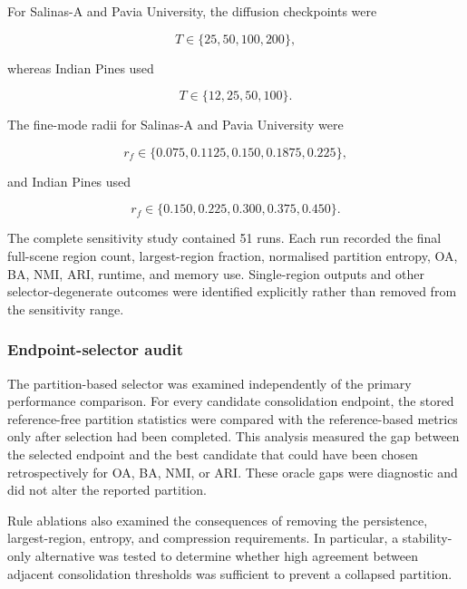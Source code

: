 \documentclass[10pt,a4paper,fleqn]{article}
\begin{document}
For Salinas-A and Pavia University, the diffusion checkpoints were

\begin{equation}
T\in\{25,50,100,200\},
\label{eq:sensitivity_checkpoint_sp}
\end{equation}

whereas Indian Pines used

\begin{equation}
T\in\{12,25,50,100\}.
\label{eq:sensitivity_checkpoint_ip}
\end{equation}

The fine-mode radii for Salinas-A and Pavia University were

\begin{equation}
r_f
\in
\{0.075,0.1125,0.150,0.1875,0.225\},
\label{eq:sensitivity_radius_sp}
\end{equation}

and Indian Pines used

\begin{equation}
r_f
\in
\{0.150,0.225,0.300,0.375,0.450\}.
\label{eq:sensitivity_radius_ip}
\end{equation}

The complete sensitivity study contained 51 runs. Each run recorded the final
full-scene region count, largest-region fraction, normalised partition entropy,
OA, BA, NMI, ARI, runtime, and memory use. Single-region outputs and other
selector-degenerate outcomes were identified explicitly rather than removed
from the sensitivity range.

\subsubsection{Endpoint-selector audit}

The partition-based selector was examined independently of the primary
performance comparison. For every candidate consolidation endpoint, the stored
reference-free partition statistics were compared with the reference-based
metrics only after selection had been completed. This analysis measured the gap between the
selected endpoint and the best candidate that could have been chosen
retrospectively for OA, BA, NMI, or ARI. These oracle gaps were diagnostic and
did not alter the reported partition.

Rule ablations also examined the consequences of removing the persistence,
largest-region, entropy, and compression requirements. In particular, a
stability-only alternative was tested to determine whether high agreement
between adjacent consolidation thresholds was sufficient to prevent a
collapsed partition.
\end{document}
